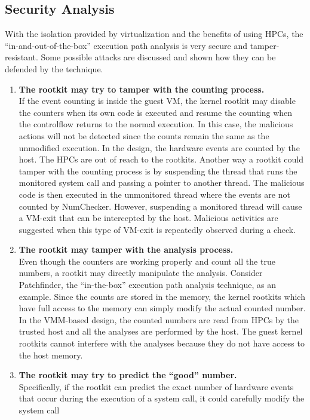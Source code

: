 \documentclass[12pt]{report}
\begin{document}
\subsection{Security Analysis}
With the isolation provided by virtualization and the benefits
of using HPCs, the “in-and-out-of-the-box” execution path
analysis is very secure and tamper-resistant. 
Some possible attacks are discussed and shown how they can be defended by the technique.
\begin{enumerate}
    \item \textbf{The rootkit may try to tamper with the
counting process.} \\If the event counting is inside the guest
VM, the kernel rootkit may disable the counters when its own
code is executed and resume the counting when the controlflow
returns to the normal execution. In this case, the malicious
actions will not be detected since the counts remain the same
as the unmodified execution. In the design, the hardware
events are counted by the host. The HPCs are out of reach
to the rootkits. Another way a rootkit could tamper with the
counting process is by suspending the thread that runs the
monitored system call and passing a pointer to another thread.
The malicious code is then executed in the unmonitored thread
where the events are not counted by NumChecker. However,
suspending a monitored thread will cause a VM-exit that can
be intercepted by the host. Malicious activities are suggested
when this type of VM-exit is repeatedly observed during a
check.
    \item \textbf{The rootkit may tamper with the analysis
process.} \\Even though the counters are working properly and
count all the true numbers, a rootkit may directly manipulate
the analysis. Consider Patchfinder, the “in-the-box” execution
path analysis technique, as an example. Since the counts are
stored in the memory, the kernel rootkits which have full
access to the memory can simply modify the actual counted
number. In the VMM-based design, the counted numbers are
read from HPCs by the trusted host and all the analyses
are performed by the host. The guest kernel rootkits cannot
interfere with the analyses because they do not have access to
the host memory.
    \item \textbf{The rootkit may try to predict the “good”
number.} \\Specifically, if the rootkit can predict the exact
number of hardware events that occur during the execution
of a system call, it could carefully modify the system call

\end{enumerate}
\end{document}
